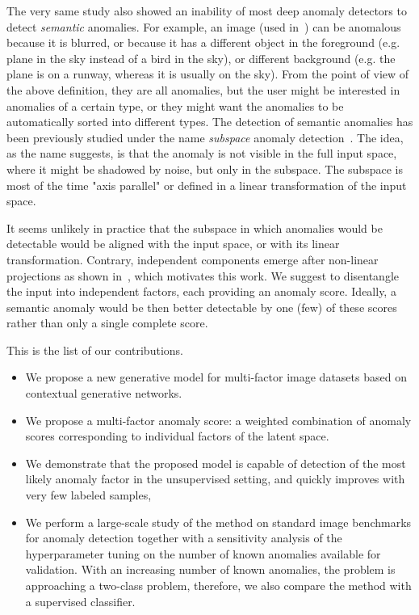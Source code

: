 The very same study also showed an inability of most deep anomaly detectors to detect \textit{semantic} anomalies. For example, an image (used in~\cite{vskvara2021comparison}) can be anomalous because it is blurred, or because it has a different object in the foreground (e.g. plane in the sky instead of a bird in the sky), or different background (e.g. the plane is on a runway, whereas it is usually on the sky). From the point of view of the above definition, they are all anomalies, but the user might be interested in anomalies of a certain type, or they might want the anomalies to be automatically sorted into different types. The detection of semantic anomalies has been previously studied under the name \emph{subspace} anomaly detection~\cite{raz2002semantic, kriegel2009outlier,rahmani2016randomized}. The idea, as the name suggests, is that the anomaly is not visible in the full input space, where it might be shadowed by noise, but only in the subspace. The subspace is most of the time "axis parallel" or defined in a linear transformation of the input space. 

It seems unlikely in practice that the subspace in which anomalies would be detectable would be aligned with the input space, or with its linear transformation. Contrary, independent components emerge after non-linear projections as shown in~\cite{burgess2018understanding, kim2018disentangling, esmaeili2019structuredhfvae, tschannen2018recent, bai2021contrastively, kim2019bayes, deecke2021transfer}, which motivates this work. We suggest to disentangle the input into independent factors, each providing an anomaly score. Ideally, a semantic anomaly would be then better detectable by one (few) of these scores rather than only a single complete score. 

This is the list of our contributions. 
\begin{itemize}
    \item We propose a new generative model for multi-factor image datasets based on contextual generative networks.
    \item We propose a multi-factor anomaly score: a weighted combination of  anomaly scores corresponding to individual factors of the latent space.
    \item We demonstrate that the proposed model is capable of detection of the most likely anomaly factor in the unsupervised setting, and quickly improves with very few labeled samples,
    \item We perform a large-scale study of the method on standard image benchmarks for anomaly detection together with a sensitivity analysis of the hyperparameter tuning on the number of known anomalies available for validation. With an increasing number of known anomalies, the problem is approaching a two-class problem, therefore, we also compare the method with a supervised classifier.
\end{itemize}

